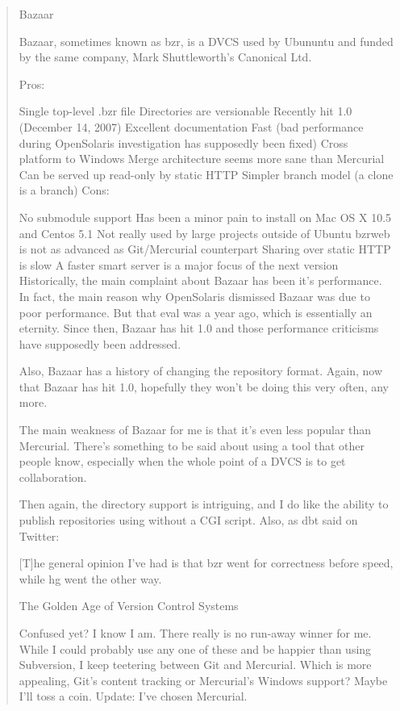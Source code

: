 \begin{enumerate}
\begin{quote}
            Bazaar

            Bazaar, sometimes known as bzr, is a DVCS used by Ubununtu and funded by the same company, Mark Shuttleworth’s Canonical Ltd.

            Pros:

            Single top-level .bzr file
            Directories are versionable
            Recently hit 1.0 (December 14, 2007)
            Excellent documentation
            Fast (bad performance during OpenSolaris investigation has supposedly been fixed)
            Cross platform to Windows
            Merge architecture seems more sane than Mercurial
            Can be served up read-only by static HTTP
            Simpler branch model (a clone is a branch)
            Cons:

            No submodule support
            Has been a minor pain to install on Mac OS X 10.5 and Centos 5.1
            Not really used by large projects outside of Ubuntu
            bzrweb is not as advanced as Git/Mercurial counterpart
            Sharing over static HTTP is slow
            A faster smart server is a major focus of the next version
            Historically, the main complaint about Bazaar has been it’s performance. In fact, the main reason why OpenSolaris dismissed Bazaar was due to poor performance. But that eval was a year ago, which is essentially an eternity. Since then, Bazaar has hit 1.0 and those performance criticisms have supposedly been addressed.

            Also, Bazaar has a history of changing the repository format. Again, now that Bazaar has hit 1.0, hopefully they won’t be doing this very often, any more.

            The main weakness of Bazaar for me is that it’s even less popular than Mercurial. There’s something to be said about using a tool that other people know, especially when the whole point of a DVCS is to get collaboration.

            Then again, the directory support is intriguing, and I do like the ability to publish repositories using without a CGI script. Also, as dbt said on Twitter:

            [T]he general opinion I’ve had is that bzr went for correctness before speed, while hg went the other way.

            The Golden Age of Version Control Systems

            Confused yet? I know I am. There really is no run-away winner for me. While I could probably use any one of these and be happier than using Subversion, I keep teetering between Git and Mercurial. Which is more appealing, Git’s content tracking or Mercurial’s Windows support? Maybe I’ll toss a coin. Update: I’ve chosen Mercurial.


\end{quote}
\end{enumerate}
